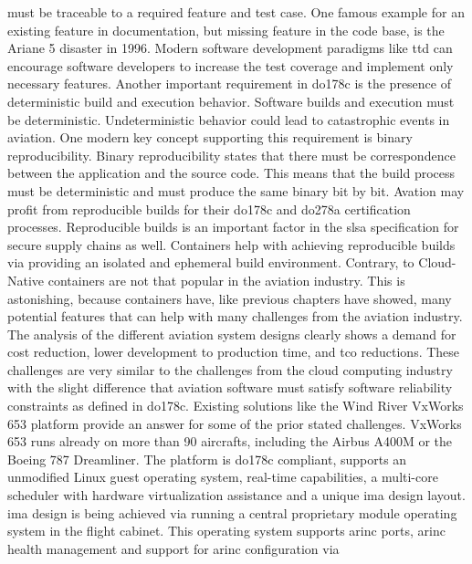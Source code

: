 \documentclass[titlepage]{report}
\begin{document}
must be traceable to a required feature and test case\cite{brosgol2010178c}. One famous example for an existing feature in documentation, but missing feature in the code base, is the Ariane 5 disaster in 1996\cite{dalal2012case}. Modern
software development paradigms like \gls{ttd} can encourage software developers to increase the test coverage and implement only necessary features\cite{panvcur2011impact}. Another important requirement in \gls{do178c} is the presence
of deterministic build and execution behavior. Software builds and execution must be deterministic. Undeterministic behavior could lead to catastrophic events in aviation. One modern key concept supporting this requirement is binary reproducibility.
Binary reproducibility states that there must be correspondence between the application and the source code\cite{binaryRepro}. This means that the build process must be deterministic and must produce the same binary bit by bit. Avation
may profit from reproducible builds for their \gls{do178c} and \gls{do278a} certification processes. Reproducible builds is an important factor in the \gls{slsa} specification for secure supply chains as well. Containers help with achieving
reproducible builds via providing an isolated and ephemeral build environment. Contrary, to Cloud-Native containers are not that popular in the aviation industry. This is astonishing, because containers have, like previous chapters have showed,
many potential features that can help with many challenges from the aviation industry. The analysis of the different aviation system designs clearly shows a demand for cost reduction, lower development to production time,
and \gls{tco} reductions. These challenges are very similar to the challenges from the cloud computing industry with the slight difference that aviation software must satisfy software reliability constraints as defined in \gls{do178c}.
Existing solutions like the Wind River VxWorks 653 platform provide an answer for some of the prior stated challenges. VxWorks 653 runs already on more than 90 aircrafts, including the Airbus A400M or the Boeing 787 Dreamliner\cite{VXWorks653}.
The platform is \gls{do178c} compliant, supports an unmodified Linux guest operating system, real-time capabilities, a multi-core scheduler with hardware virtualization assistance and a unique \gls{ima} design layout\cite{VXWorks653Platform}.
\gls{ima} design is being achieved via running a central proprietary module operating system in the flight cabinet. This operating system supports \gls{arinc} ports, \gls{arinc} health management and support for \gls{arinc} configuration via
\end{document}
